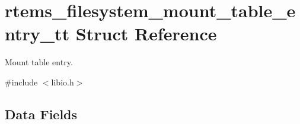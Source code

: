 \hypertarget{structrtems__filesystem__mount__table__entry__tt}{}\section{rtems\+\_\+filesystem\+\_\+mount\+\_\+table\+\_\+entry\+\_\+tt Struct Reference}
\label{structrtems__filesystem__mount__table__entry__tt}


Mount table entry.  




{\ttfamily \#include $<$libio.\+h$>$}

\subsection*{Data Fields}
